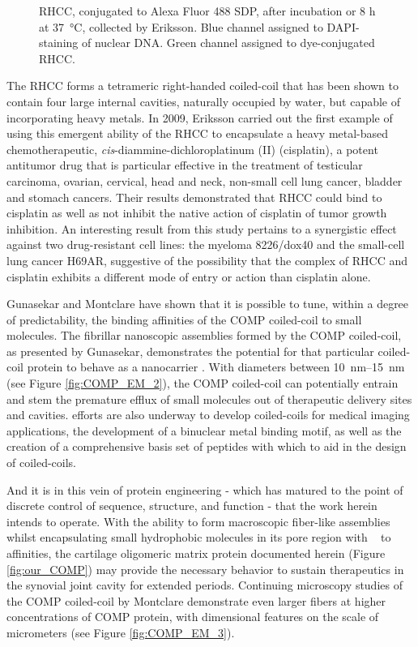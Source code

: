 \begin{refsection}
\begin{figure}[h!]
{        RHCC, conjugated to Alexa Fluor 488 SDP, after incubation or 8 h at
        \SI{37}{\celsius}, collected by Eriksson. Blue channel assigned to
        DAPI-staining of nuclear DNA. Green channel assigned to dye-conjugated
        RHCC.\cite{Eriksson2009}}\label{fig:coiled-coil_binding}
\end{figure}
The RHCC forms a tetrameric right-handed coiled-coil that has been shown to
contain four large internal cavities, naturally occupied by water, but capable
of incorporating heavy metals. In 2009, Eriksson  carried out the
first example of using this emergent ability of the RHCC to encapsulate a
heavy metal-based chemotherapeutic, \emph{cis}-diammine-dichloroplatinum (II)
(cisplatin), a potent antitumor drug that is particular effective in the
treatment of testicular carcinoma, ovarian, cervical, head and neck, 
non-small cell lung cancer, bladder and stomach cancers.\cite{Go1999} Their
results demonstrated that RHCC could bind to cisplatin as well as not inhibit
the native action of cisplatin of tumor growth inhibition. An interesting result
from this study pertains to a synergistic effect against two drug-resistant cell
lines: the myeloma 8226/dox40 and the small-cell lung cancer H69AR, suggestive
of the possibility that the complex of RHCC and cisplatin exhibits a different
mode of entry or action than cisplatin alone.

Gunasekar and Montclare have shown that it is possible to tune, within
a degree of predictability, the binding affinities of the COMP coiled-coil to small
molecules.\cite{Gunasekar2009} The fibrillar nanoscopic assemblies formed by
the COMP coiled-coil, as presented by Gunasekar,\cite{Gunasekar2012}
demonstrates the potential for that particular coiled-coil protein to behave as
a nanocarrier .  With diameters between \SIrange{10}{15}{\nm}
(see Figure \ref{fig:COMP_EM_2}), the COMP coiled-coil can potentially entrain
and stem the premature efflux of small molecules out of therapeutic delivery
sites and cavities.  efforts are also underway to develop
coiled-coils for medical imaging applications, the development of a binuclear
metal binding motif, as well as the creation of a comprehensive basis set of
peptides with which to aid in the design of 
coiled-coils.\cite{Shiga2012,Fletcher2012,Berwick2014}

And it is in this vein of protein engineering - which has matured to the point
of discrete control of sequence, structure, and function - that the work herein
intends to operate. With the ability to form macroscopic fiber-like assemblies
whilst encapsulating small hydrophobic molecules in its pore region with
\si{\micro\moLar} to \si{\nano\moLar} affinities,
the cartilage oligomeric matrix protein documented herein (Figure
\ref{fig:our_COMP}) may provide the necessary behavior to sustain therapeutics
in the synovial joint cavity for extended periods. Continuing microscopy studies
of the COMP coiled-coil by Montclare demonstrate even larger fibers at higher
concentrations of COMP protein, with dimensional features on the scale of
micrometers (see Figure \ref{fig:COMP_EM_3}).


\end{refsection}
